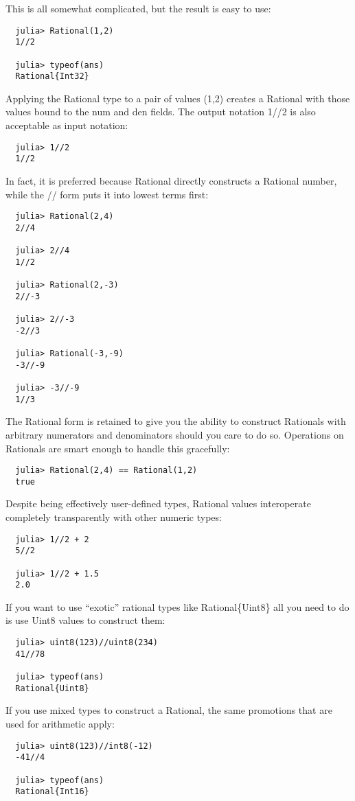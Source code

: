 \documentclass{article}
\begin{document}
This is all somewhat complicated, but the result is easy to use:
\begin{verbatim}
  julia> Rational(1,2)
  1//2

  julia> typeof(ans)
  Rational{Int32}
\end{verbatim}
Applying the Rational type to a pair of values (1,2) creates a Rational with those values bound to the num and den fields. The output notation 1//2 is also acceptable as input notation:
\begin{verbatim}
  julia> 1//2
  1//2
\end{verbatim}
In fact, it is preferred because Rational directly constructs a Rational number, while the // form puts it into lowest terms first:
\begin{verbatim}
  julia> Rational(2,4)
  2//4

  julia> 2//4
  1//2

  julia> Rational(2,-3)
  2//-3

  julia> 2//-3
  -2//3

  julia> Rational(-3,-9)
  -3//-9

  julia> -3//-9
  1//3
\end{verbatim}
The Rational form is retained to give you the ability to construct Rationals with arbitrary numerators and denominators should you care to do so. Operations on Rationals are smart enough to handle this gracefully:
\begin{verbatim}
  julia> Rational(2,4) == Rational(1,2)
  true
\end{verbatim}
Despite being effectively user-defined types, Rational values interoperate completely transparently with other numeric types:
\begin{verbatim}
  julia> 1//2 + 2
  5//2

  julia> 1//2 + 1.5
  2.0
\end{verbatim}
If you want to use ``exotic'' rational types like Rational\{Uint8\} all you need to do is use Uint8 values to construct them:
\begin{verbatim}
  julia> uint8(123)//uint8(234)
  41//78

  julia> typeof(ans)
  Rational{Uint8}
\end{verbatim}
If you use mixed types to construct a Rational, the same promotions that are used for arithmetic apply:
\begin{verbatim}
  julia> uint8(123)//int8(-12)
  -41//4

  julia> typeof(ans)
  Rational{Int16}
\end{verbatim}
\end{document}
